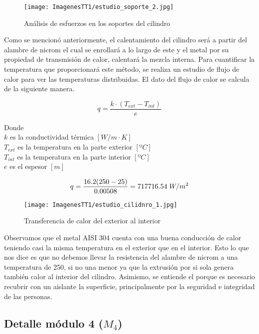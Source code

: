 \documentclass[14pt,oneside]{extarticle} %
\begin{document}
\begin{figure}[H]
    \centering
    \texttt{[image: ImagenesTT1/estudio\_soporte\_2.jpg]}
    \caption{Análisis de esfuerzos en los soportes del cilindro}
    \label{fig:estudio_soporte_2}
\end{figure}

Como se mencionó anteriormente, el calentamiento del cilindro será a partir del alambre de nicrom el cual se enrollará a lo largo de este y el metal por su propiedad de transmisión de calor, calentará la mezcla interna. Para cuantificar la temperatura que proporcionará este método, se realiza un estudio de flujo de calor para ver las temperaturas distribuidas. El dato del flujo de calor se calcula de la siguiente manera.

\begin{equation}
    q=\frac{k\cdot (T_{ext}-T_{int})}{e}
\end{equation}

Donde\\
$k$ es la conductividad térmica $[W/m\cdot K]$\\
$T_{ext}$ es la temperatura en la parte exterior $[ºC]$\\
$T_{int}$ es la temperatura en la parte interior $[ºC]$\\
$e$ es el espesor $[m]$

\begin{equation*}
    q=\frac{16.2(250-25)}{0.00508}=717716.54\hspace{.1cm}W/m^2
\end{equation*}


\begin{figure}[H]
    \centering
    \texttt{[image: ImagenesTT1/estudio\_cilidnro\_1.jpg]}
    \caption{Transferencia de calor del exterior al interior}
    \label{fig:estudio_cilidnro_1}
\end{figure}

Observamos que el metal AISI 304 cuenta con una buena conducción de calor teniendo casi la misma temperatura en el exterior que en el interior. Esto lo que nos dice es que no debemos llevar la resistencia del alambre de nicrom a una temperatura de 250, si no una menor ya que la extrusión por si sola genera también calor al interior del cilindro. Asimismo, se entiende el porque es necesario recubrir con un aislante la superficie, principalmente por la seguridad e integridad de las personas.


\subsection{Detalle módulo 4 ($M_4$)}
\end{document}
